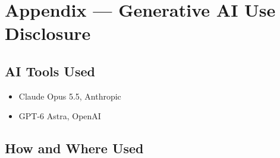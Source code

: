 \documentclass[12pt, titlepage]{article}
\begin{document}
\newpage{}

\section{Appendix --- Generative AI Use Disclosure}

\subsection{AI Tools Used}

\begin{itemize}
    \item Claude Opus 5.5, Anthropic
    \item GPT-6 Astra, OpenAI
\end{itemize}

\subsection{How and Where Used}
\end{document}

